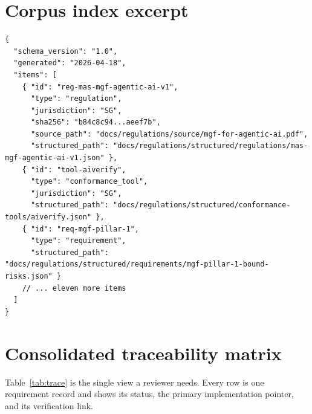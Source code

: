 \section{Corpus index excerpt}

\begin{lstlisting}[language=jsonx,caption={Excerpt of \texttt{docs/regulations/structured/corpus.json}.}]
{
  "schema_version": "1.0",
  "generated": "2026-04-18",
  "items": [
    { "id": "reg-mas-mgf-agentic-ai-v1",
      "type": "regulation",
      "jurisdiction": "SG",
      "sha256": "b84c8c94...aeef7b",
      "source_path": "docs/regulations/source/mgf-for-agentic-ai.pdf",
      "structured_path": "docs/regulations/structured/regulations/mas-mgf-agentic-ai-v1.json" },
    { "id": "tool-aiverify",
      "type": "conformance_tool",
      "jurisdiction": "SG",
      "structured_path": "docs/regulations/structured/conformance-tools/aiverify.json" },
    { "id": "req-mgf-pillar-1",
      "type": "requirement",
      "structured_path": "docs/regulations/structured/requirements/mgf-pillar-1-bound-risks.json" }
    // ... eleven more items
  ]
}
\end{lstlisting}

\section{Consolidated traceability matrix}

Table~\ref{tab:trace} is the single view a reviewer needs. Every row is
one requirement record and shows its status, the primary implementation
pointer, and its verification link.

